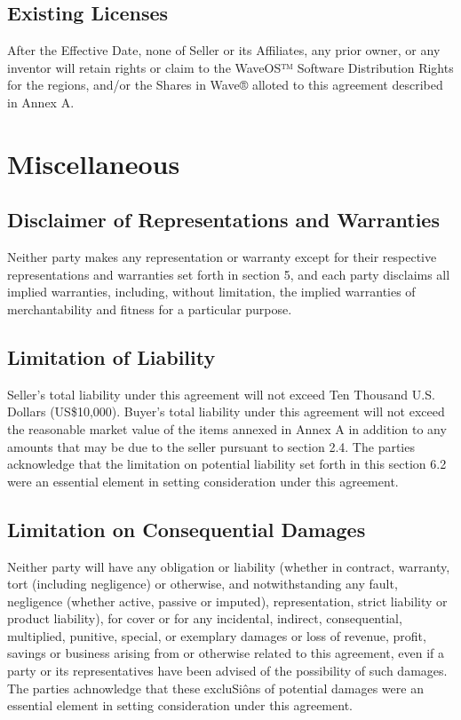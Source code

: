 \documentclass[letterpaper,10pt,english]{sphinxmanual}
\begin{document}
\subsection{Existing Licenses}
\label{\detokenize{6-representations:existing-licenses}}
After the Effective Date, none of Seller or its Affiliates, any prior owner, or any inventor will retain rights or claim to the WaveOS™ Software Distribution Rights for the regions, and/or the Shares in Wave® alloted to this agreement described in Annex A.


\section{Miscellaneous}
\label{\detokenize{7-miscellaneous:miscellaneous}}\label{\detokenize{7-miscellaneous::doc}}

\subsection{Disclaimer of Representations and Warranties}
\label{\detokenize{7-miscellaneous:disclaimer-of-representations-and-warranties}}
Neither party makes any representation or warranty except for their respective representations and warranties set forth in section 5, and each party disclaims all implied warranties, including, without limitation, the implied warranties of merchantability and fitness for a particular purpose.


\subsection{Limitation of Liability}
\label{\detokenize{7-miscellaneous:limitation-of-liability}}
Seller’s total liability under this agreement will not exceed Ten Thousand U.S. Dollars (US\$10,000). Buyer’s total liability under this agreement will not exceed the reasonable market value of the items annexed in Annex A in addition to any amounts that may be due to the seller pursuant to section 2.4. The parties acknowledge that the limitation on potential liability set forth in this section 6.2 were an essential element in setting consideration under this agreement.


\subsection{Limitation on Consequential Damages}
\label{\detokenize{7-miscellaneous:limitation-on-consequential-damages}}
Neither party will have any obligation or liability (whether in contract, warranty, tort (including negligence) or otherwise, and notwithstanding any fault, negligence (whether active, passive or imputed), representation, strict liability or product liability), for cover or for any incidental, indirect, consequential, multiplied, punitive, special, or exemplary damages or loss of revenue, profit, savings or business arising from or otherwise related to this agreement, even if a party or its representatives have been advised of the possibility of such damages. The parties achnowledge that these excluSiôns of potential damages were an essential element in setting consideration under this agreement.
\end{document}
